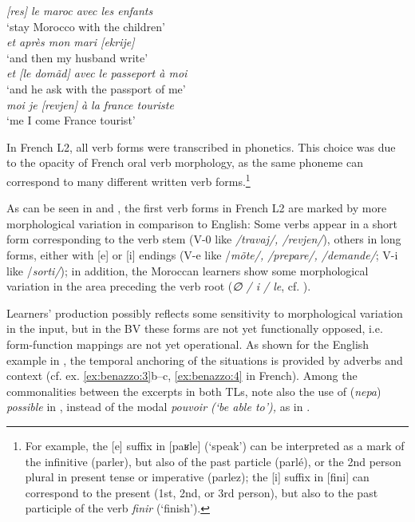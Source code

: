 \documentclass[output=paper]{langscibook}
\begin{document}
\hphantom{Speaker}  \textit{[res] le maroc avec les enfants}\\
    {} {`stay Morocco with the children'}\\
    {} \textit{et après mon mari [ekrije]} \\
    {} {`and then my husband write'}\\
    {} \textit{et [le domãd] avec le passeport à moi}\\
    {} {`and he ask with the passport of me'}\\
    {} \textit{moi je [revjen] à la france touriste}\\
    {} {`me I come France tourist'}\\
\z

In French L2, all verb forms were transcribed in phonetics. This choice was due to the opacity of French oral verb morphology, as the same phoneme can correspond to many different written verb forms.\footnote{For example, the [e] suffix in [paʁle] (‘speak’) can be interpreted as a mark of the infinitive (parler), but also of the past particle (parlé), or the 2nd person plural in present tense or imperative (parlez); the [i] suffix in [fini] can correspond to the present (1st, 2nd, or 3rd person), but also to the past participle of the verb \textit{finir} (‘finish’).}

As can be seen in  and , the first verb forms in French L2 are marked by more morphological variation in comparison to English: Some verbs appear in a short form corresponding to the verb stem (V-0 like \textit{/travaj/, /revjen/}), others in long forms, either with [e] or [i] endings (V-e like /\textit{mõte/, /prepare/, /demande/}; V-i like /\textit{sorti/}); in addition, the Moroccan learners show some morphological variation in the area preceding the verb root (\textit{∅ / i / le}, cf. \citealt[48]{Véronique2000}). 

Learners’ production possibly reflects some sensitivity to morphological variation in the input, but in the BV these forms are not yet functionally opposed, i.e. form-function mappings are not yet operational. As shown for the English example in , the temporal anchoring of the situations is provided by adverbs and context (cf. ex. \ref{ex:benazzo:3}b--c, \ref{ex:benazzo:4} in French). Among the commonalities between the excerpts in both TLs, note also the use of (\textit{nepa}) \textit{possible} in , instead of the modal \textit{pouvoir (‘be able to'),} as in .
\end{document}
